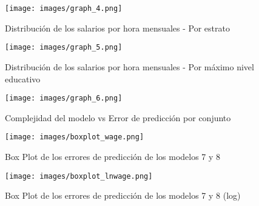 \documentclass[11pt,oneside]{article}
\begin{document}
\begin{figure}[H]
    \centering
    \caption{Distribución de los salarios por hora mensuales - Por estrato}
    \label{fig:graph_4}
        \texttt{[image: images/graph\_4.png]} \\
\end{figure}



\begin{figure}[H]
    \centering
    \caption{Distribución de los salarios por hora mensuales - Por máximo nivel educativo}
    \label{fig:graph_5}
        \texttt{[image: images/graph\_5.png]} \\
\end{figure}


\begin{figure}[H]
    \centering
    \caption{Complejidad del modelo vs Error de predicción por conjunto}
    \label{fig:graph_6}
        \texttt{[image: images/graph\_6.png]} \\
\end{figure}




\begin{figure}[H]
    \centering
    \caption{Box Plot de los errores de predicción de los modelos 7 y 8}
    \label{fig:3c3_boxplot}
        \texttt{[image: images/boxplot\_wage.png]} \\
\end{figure}
\begin{figure}[H]
    \centering
    \caption{Box Plot de los errores de predicción de los modelos 7 y 8 (log)}
    \label{fig:3c3_boxplot_log}
        \texttt{[image: images/boxplot\_lnwage.png]} \\
\end{figure}
\end{document}
